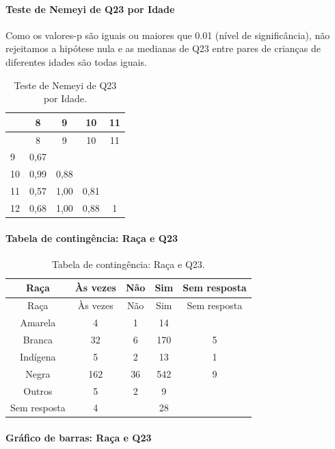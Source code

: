 \documentclass[]{article}
\let\oldparagraph\paragraph
\renewcommand{\paragraph}[1]{\oldparagraph{#1}\mbox{}}
\begin{document}
\hypertarget{teste-de-nemeyi-de-q23-por-idade}{%
\paragraph{Teste de Nemeyi de Q23 por Idade}\label{teste-de-nemeyi-de-q23-por-idade}}

Como os valores-p são iguais ou maiores que 0.01 (nível de significância), não rejeitamos a hipótese nula e as medianas de Q23 entre pares de crianças de diferentes idades são todas iguais.

\begin{longtable}[]{@{}lcccc@{}}
\caption{\label{tab:unnamed-chunk-573}Teste de Nemeyi de Q23 por Idade.}\tabularnewline
\toprule
& 8 & 9 & 10 & 11\tabularnewline
\midrule
\endfirsthead
\toprule
& 8 & 9 & 10 & 11\tabularnewline
\midrule
\endhead
9 & 0,67 & & &\tabularnewline
10 & 0,99 & 0,88 & &\tabularnewline
11 & 0,57 & 1,00 & 0,81 &\tabularnewline
12 & 0,68 & 1,00 & 0,88 & 1\tabularnewline
\bottomrule
\end{longtable}

\cleardoublepage

\hypertarget{tabela-de-continguxeancia-rauxe7a-e-q23}{%
\paragraph{Tabela de contingência: Raça e Q23}\label{tabela-de-continguxeancia-rauxe7a-e-q23}}

\begin{longtable}[]{@{}ccccc@{}}
\caption{\label{tab:unnamed-chunk-574}Tabela de contingência: Raça e Q23.}\tabularnewline
\toprule
Raça & Às vezes & Não & Sim & Sem resposta\tabularnewline
\midrule
\endfirsthead
\toprule
Raça & Às vezes & Não & Sim & Sem resposta\tabularnewline
\midrule
\endhead
Amarela & 4 & 1 & 14 &\tabularnewline
Branca & 32 & 6 & 170 & 5\tabularnewline
Indígena & 5 & 2 & 13 & 1\tabularnewline
Negra & 162 & 36 & 542 & 9\tabularnewline
Outros & 5 & 2 & 9 &\tabularnewline
Sem resposta & 4 & & 28 &\tabularnewline
\bottomrule
\end{longtable}

\hypertarget{gruxe1fico-de-barras-rauxe7a-e-q23}{%
\paragraph{Gráfico de barras: Raça e Q23}\label{gruxe1fico-de-barras-rauxe7a-e-q23}}
\end{document}
